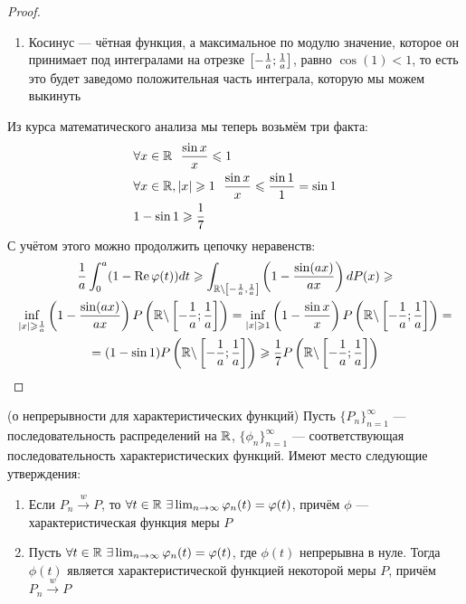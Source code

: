 \begin{proof}
\begin{enumerate}
    	\item Косинус --- чётная функция, а максимальное по модулю значение, которое он принимает под интегралами на отрезке $\left[-\frac{1}{a}; \frac{1}{a}\right]$, равно $\cos(1) < 1$, то есть это будет заведомо положительная часть интеграла, которую мы можем выкинуть
    \end{enumerate}
    Из курса математического анализа мы теперь возьмём три факта:
    \begin{align*}
        &{\forall x \in \mathbb{R}\ \ \frac{\sin x}{x} \leqslant 1}
        \\
        &{\forall x \in \mathbb{R}, |x| \geqslant 1\ \ \frac{\sin x}{x} \leqslant \frac{\sin 1}{1} = \sin 1}
        \\
        &{1 - \sin 1 \geqslant \frac{1}{7}}
    \end{align*}
    С учётом этого можно продолжить цепочку неравенств:
    \begin{multline*}
        \frac{1}{a} \int_0^a (1 - \operatorname{Re}\varphi(t))dt \geqslant \int_{\mathbb{R} \backslash \left[-\frac{1}{a}, \frac{1}{a}\right]} \left(1 - \frac{\sin(ax)}{ax}\right) dP(x) \geqslant
        \\
        \inf_{|x| \geqslant \frac{1}{a}} \left(1 - \frac{\sin(ax)}{ax}\right) P\left(\mathbb{R} \backslash \left[-\frac{1}{a}; \frac{1}{a}\right]\right) = \inf_{|x| \geqslant 1} \left(1 - \frac{\sin x}{x}\right) P\left(\mathbb{R} \backslash \left[-\frac{1}{a}; \frac{1}{a}\right]\right) =
        \\
        = (1 - \sin 1) P\left(\mathbb{R} \backslash \left[-\frac{1}{a}; \frac{1}{a}\right]\right) \geqslant \frac{1}{7} P\left(\mathbb{R} \backslash \left[-\frac{1}{a}; \frac{1}{a}\right]\right)
    \end{multline*}
\end{proof}

\begin{theorem} (о непрерывности для характеристических функций)
    Пусть $\{P_n\}_{n = 1}^\infty$ --- последовательность распределений на $\mathbb{R}$, $\{\phi_n\}_{n = 1}^\infty$ --- соответствующая последовательность характеристических функций. Имеют место следующие утверждения:
    \begin{enumerate}
        \item Если $P_n \xrightarrow{w} P$, то $\forall t \in \mathbb{R}\ \exists \lim_{n \to \infty} \varphi_n(t) = \varphi(t)$, причём $\phi$ --- характеристическая функция меры $P$
        \item Пусть $\forall t \in \mathbb{R}\ \exists \lim_{n \to \infty} \varphi_n(t) = \varphi(t)$, где $\phi(t)$ непрерывна в нуле. Тогда $\phi(t)$ является характеристической функцией некоторой меры $P$, причём $P_n \xrightarrow{w} P$
    \end{enumerate}
\end{theorem}

